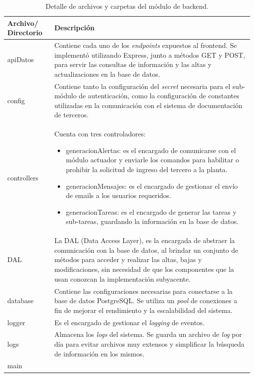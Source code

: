 \begin{table}[h]
	\centering
	\caption[Carpetas backend ]{Detalle de archivos y carpetas del módulo de backend.}
	\begin{tabular}{p{2cm} p{11cm}} 	
		\toprule
		\textbf{Archivo/
		Directorio} & 
		\textbf{Descripción} 
		\\
		\midrule
apiDatos & Contiene cada uno de los \textit{endpoints} expuestos al frontend. Se implementó utilizando Express, junto a métodos GET y POST, para servir las consultas de información y las altas y actualizaciones en la base de datos. \\
config & Contiene tanto la configuración del \textit{secret} necesaria para el sub-módulo de autenticación, como la configuración de constantes utilizadas en la comunicación con el sistema de documentación de terceros. \\
controllers & Cuenta con tres controladores:
\begin{itemize}
\item generacionAlertas: es el encargado de comunicarse con el módulo actuador y enviarle los comandos para habilitar o prohibir la solicitud de ingreso del tercero a la planta.
\item generacionMensajes: es el encargado de gestionar el envío de emails a los usuarios requeridos.
\item generacionTareas: es el encargado de generar las tareas y sub-tareas, guardando la información en la base de datos.
\end{itemize} \\
DAL & La DAL (Data Access Layer), es la encargada de abstraer la comunicación con la base de datos, al brindar un conjunto de métodos para acceder y realizar las altas, bajas y modificaciones, sin necesidad de que los componentes que la usan conozcan la implementación subyacente. \\
database & Contiene las configuraciones necesarias para conectarse a la base de datos PostgreSQL. Se utiliza un \textit{pool} de conexiones a fin de mejorar el rendimiento y la escalabilidad del sistema. \\
logger & Es el encargado de gestionar el \textit{logging} de eventos.\\
logs & Almacena los \textit{logs} del sistema. Se guarda un archivo de \textit{log} por día para evitar archivos muy extensos y simplificar la búsqueda de información en los mismos. \\
main


\end{tabular}
\end{table}
